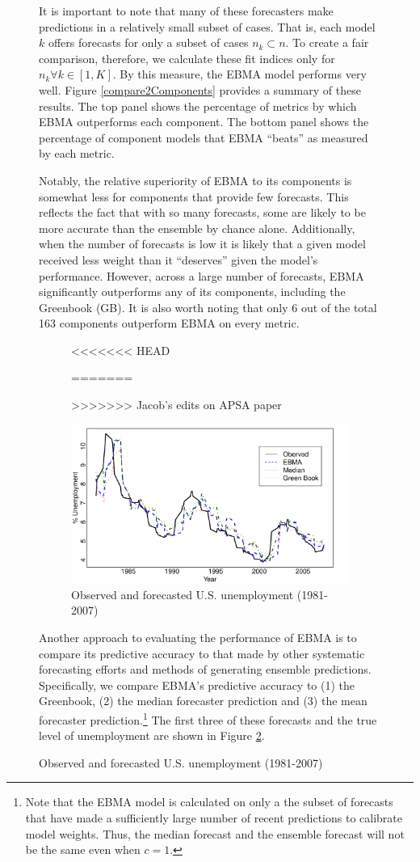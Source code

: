 \documentclass[12pt,fullpage,endnotes]{article}
\begin{document}
\begin{figure}[h]
It is important to note that many of these forecasters make
predictions in a relatively small subset of cases.  That is, each
model $k$ offers forecasts for only a subset of cases $n_k \subset n$.
To create a fair comparison, therefore, we calculate these fit indices
only for $n_k \forall k \in [1,K]$.  By this measure, the EBMA model
performs very well.  Figure \ref{compare2Components} provides a
summary of these results.  The top panel shows the percentage of
metrics by which EBMA outperforms each component. The bottom panel
shows the percentage of component models that EBMA ``beats'' as
measured by each metric.

Notably, the relative superiority of EBMA to its components is
somewhat less for components that provide few forecasts.  This
reflects the fact that with so many forecasts, some are likely to be
more accurate than the ensemble by chance alone. Additionally, when the number of forecasts is low it is likely that a given model received less weight than it ``deserves'' given the model's performance. However, across a
large number of forecasts, EBMA significantly outperforms any of its
components, including the Greenbook (GB).  It is also worth noting
that only 6 out of the total 163 components outperform EBMA on every
metric.

\begin{figure}[h]
<<<<<<< HEAD
\caption{Time-series plot of the Unemployment Forecasts}
=======
\caption{Observed and forecasted U.S. unemployment (1981-2007)}
>>>>>>> Jacob's edits on APSA paper
\label{timeSeries}
\begin{center}
\includegraphics[scale=.8]{timeSeries}
\end{center}
\end{figure}


Another approach to evaluating the performance of EBMA is to compare
its predictive accuracy to that made by other systematic forecasting
efforts and methods of generating ensemble predictions.  Specifically,
we compare EBMA's predictive accuracy to (1) the Greenbook, (2) the
median forecaster prediction and (3) the mean forecaster
prediction.\footnote{Note that the EBMA model is calculated on only a the
  subset of forecasts that have made a sufficiently large number of
  recent predictions to calibrate model weights.  Thus, the median
  forecast and the ensemble forecast will not be the same even when
  $c=1$.  }  The first three of these forecasts and the true level of
unemployment are shown in Figure \ref{timeSeries}.


\end{figure}
\end{document}

